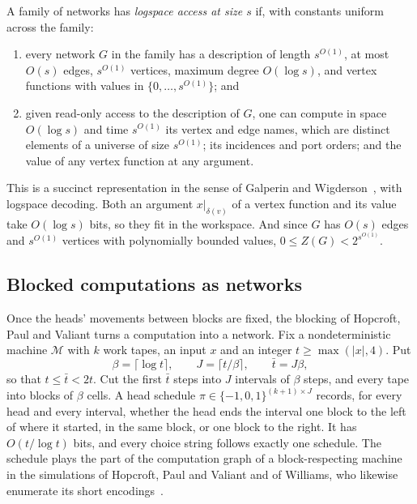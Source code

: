 \documentclass[11pt]{article}
\theoremstyle{definition}
\theoremstyle{definition}
\theoremstyle{remark}
\begin{document}
\begin{definition}\label{def:access}
A family of networks has \emph{logspace access at size $s$} if, with constants uniform across the family:
\begin{enumerate}[label=(\alph*)]
\item every network $G$ in the family has a description of length $s^{O(1)}$, at most $O(s)$ edges, $s^{O(1)}$ vertices, maximum degree $O(\log s)$, and vertex functions with values in $\{0,\dots,s^{O(1)}\}$; and
\item given read-only access to the description of $G$, one can compute in space $O(\log s)$ and time $s^{O(1)}$ its vertex and edge names, which are distinct elements of a universe of size $s^{O(1)}$; its incidences and port orders; and the value of any vertex function at any argument.
\end{enumerate}
\end{definition}

This is a succinct representation in the sense of Galperin and Wigderson~\cite{GW83,Wag86}, with logspace decoding. Both an argument $x|_{\delta(v)}$ of a vertex function and its value take $O(\log s)$ bits, so they fit in the workspace. And since $G$ has $O(s)$ edges and $s^{O(1)}$ vertices with polynomially bounded values, $0\le Z(G)<2^{s^{O(1)}}$.

\subsection{Blocked computations as networks}

Once the heads' movements between blocks are fixed, the blocking of Hopcroft, Paul and Valiant turns a computation into a network. Fix a nondeterministic machine $\mathcal M$ with $k$ work tapes, an input $x$ and an integer $t\ge\max(|x|,4)$. Put
\[
\beta=\lceil\log t\rceil,\qquad J=\lceil t/\beta\rceil,\qquad\bar t=J\beta,
\]
so that $t\le\bar t<2t$. Cut the first $\bar t$ steps into $J$ intervals of $\beta$ steps, and every tape into blocks of $\beta$ cells. A head schedule $\pi\in\{-1,0,1\}^{(k+1)\times J}$ records, for every head and every interval, whether the head ends the interval one block to the left of where it started, in the same block, or one block to the right. It has $O(t/\log t)$ bits, and every choice string follows exactly one schedule. The schedule plays the part of the computation graph of a block-respecting machine in the simulations of Hopcroft, Paul and Valiant and of Williams, who likewise enumerate its short encodings~\cite{HPV77,Wil25}.
\end{document}
